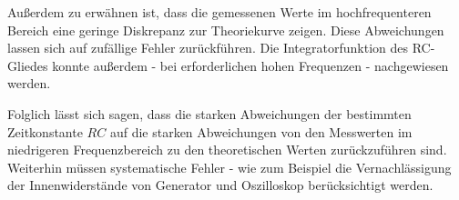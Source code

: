 Außerdem zu erwähnen ist, dass die gemessenen Werte im hochfrequenteren Bereich eine geringe
Diskrepanz zur Theoriekurve zeigen. Diese Abweichungen lassen sich auf zufällige Fehler zurückführen.
Die Integratorfunktion des RC-Gliedes konnte außerdem - bei erforderlichen hohen Frequenzen - 
nachgewiesen werden.

Folglich lässt sich sagen, dass die starken Abweichungen der bestimmten Zeitkonstante $RC$ auf die starken Abweichungen von den Messwerten im niedrigeren Frequenzbereich zu den theoretischen Werten zurückzuführen sind.
Weiterhin müssen systematische Fehler - wie zum Beispiel die Vernachlässigung der Innenwiderstände von Generator und Oszilloskop berücksichtigt werden.
